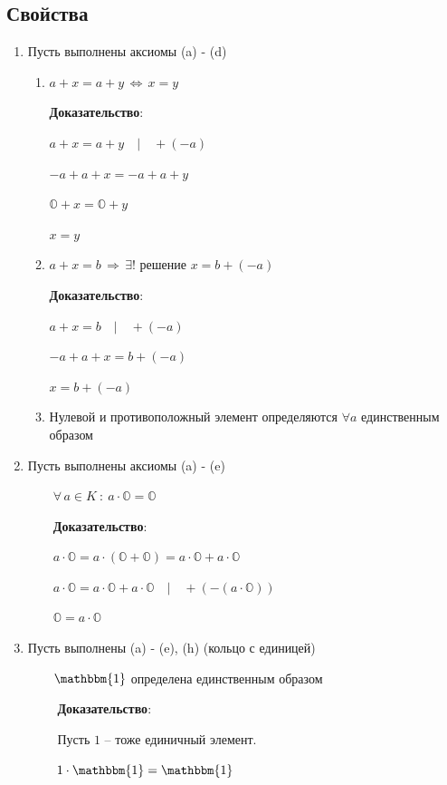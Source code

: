 \documentclass{article}
\begin{document}
\subsection{Свойства}
\begin{enumerate}
    \item Пусть выполнены аксиомы (a) - (d)
    \begin{enumerate}
        \item $a+x=a+y\,\Leftrightarrow\,x=y$
        
        \textbf{Доказательство}: 
        
        $a+x=a+y\quad|\quad+(-a)$
        
        $-a+a+x=-a+a+y$
        
        $\mathbb{O}+x=\mathbb{O}+y$
        
        $x=y$
        \item $a+x=b\,\Rightarrow\,\exists!$ решение $x=b+(-a)$
        
        \textbf{Доказательство}:
        
        $a+x=b\quad|\quad+(-a)$
        
        $-a+a+x=b+(-a)$
        
        $x=b+(-a)$
        \item Нулевой и противоположный элемент определяются $\forall a$ единственным образом
    \end{enumerate}
    \item Пусть выполнены аксиомы (a) - (e)
    
    $\quad\quad\forall\,a\in K\::\:a\cdot\mathbb{O}=\mathbb{O}$
    
    $\quad\quad$\textbf{Доказательство}:
    
    $\quad\quad a\cdot\mathbb{O}=a\cdot(\mathbb{O}+\mathbb{O})=a\cdot\mathbb{O}+a\cdot\mathbb{O}$
    
    $\quad\quad a\cdot\mathbb{O}=a\cdot\mathbb{O}+a\cdot\mathbb{O}\quad |\quad +(-(a\cdot\mathbb{O}))$
    
    $\quad\quad \mathbb{O}=a\cdot\mathbb{O}$
    \item Пусть выполнены (a) - (e), (h) (кольцо с единицей)
    
    $\quad\quad\mathbbm{1}$ определена единственным образом
    
    $\quad\quad$ \textbf{Доказательство}:
    
    $\quad\quad$ Пусть $1$ -- тоже единичный элемент.
    
    $\quad\quad\: 1\cdot\mathbbm{1}=\mathbbm{1}$
    

\end{enumerate}
\end{document}
